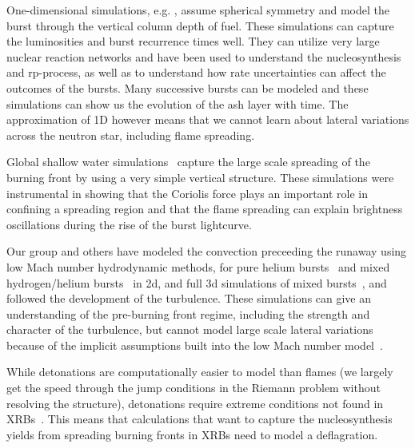\documentclass[a4paper]{jpconf}
\begin{document}
One-dimensional simulations, e.g. \cite{woosley-xrb,fisker:2008}, assume
spherical symmetry and model the burst through the vertical column
depth of fuel.  These simulations can capture the luminosities and
burst recurrence times well.  They can utilize very large nuclear
reaction networks and have been used to understand the nucleosynthesis
and rp-process, as well as to understand how rate uncertainties can
affect the outcomes of the bursts.  Many successive bursts can be
modeled and these simulations can show us the evolution of the ash
layer with time.  The approximation of 1D however means that we cannot
learn about lateral variations across the neutron star, including
flame spreading.

Global shallow water simulations~\cite{SPIT_ETAL02} capture the
large scale spreading of the burning front by using a very simple
vertical structure.  These simulations were instrumental in showing
that the Coriolis force plays an important role in confining a
spreading region and that the flame spreading can explain brightness
oscillations during the rise of the burst lightcurve.

Our group and others have modeled the convection preceeding the
runaway using low Mach number hydrodynamic methods, for pure helium
bursts~\cite{Lin:2006,xrb} and mixed hydrogen/helium
bursts~\cite{xrb2} in 2d, and full 3d simulations of mixed
bursts~\cite{xrb3}, and followed the development of the turbulence.
These simulations can give an understanding of the pre-burning front
regime, including the strength and character of the turbulence, but
cannot model large scale lateral variations because of the implicit
assumptions built into the low Mach number model~\cite{ABRZ:I}.

While detonations are computationally easier to model than flames (we
largely get the speed through the jump conditions in the Riemann
problem without resolving the structure), detonations require extreme
conditions not found in XRBs~\cite{ZINGALE_ETAL01,harpole:2018}.
This means that calculations that want to capture the nucleosynthesis
yields from spreading burning fronts in XRBs need to model a deflagration.
\end{document}
